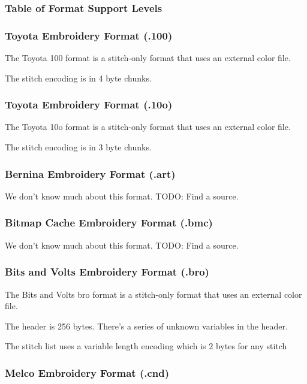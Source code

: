 \documentclass[a4paper, 11pt]{report}
\begin{document}
\subsubsection{Table of Format Support Levels}



\subsubsection{Toyota Embroidery Format (.100)}

The Toyota 100 format is a stitch-only format that uses an external color file.

The stitch encoding is in 4 byte chunks.

\subsubsection{Toyota Embroidery Format (.10o)}

The Toyota 10o format is a stitch-only format that uses an external color file.

The stitch encoding is in 3 byte chunks.

\subsubsection{Bernina Embroidery Format (.art)}

We don't know much about this format. TODO: Find a source.

\subsubsection{Bitmap Cache Embroidery Format (.bmc)}

We don't know much about this format. TODO: Find a source.

\subsubsection{Bits and Volts Embroidery Format (.bro)}

The Bits and Volts bro format is a stitch-only format that uses an external color file.

The header is 256 bytes. There's a series of unknown variables in the header.

The stitch list uses a variable length encoding which is 2 bytes for any stitch

\subsubsection{Melco Embroidery Format (.cnd)}
\end{document}

